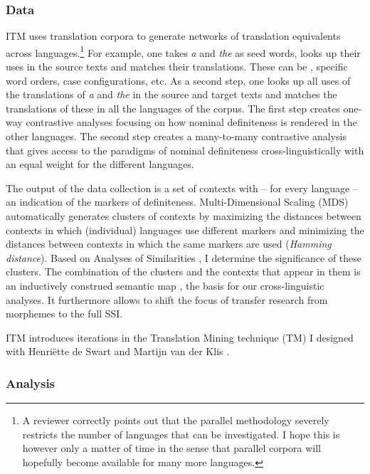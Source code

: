 \documentclass[output=paper,
modfonts
]{langscibook}
\begin{document}
\subsubsection{Data}

ITM uses translation corpora to generate networks of translation equivalents across languages.\footnote{A reviewer correctly points out that the parallel methodology severely restricts the number of languages that can be investigated. I hope this is however only a matter of time in the sense that parallel corpora will hopefully become available for many more languages.} For example, one takes \textit{a} and \textit{the} as seed words, looks up their uses in the  source texts and matches their translations. These can be , specific word orders, case configurations, etc. As a second step, one looks up all uses of the translations of \textit{a} and \textit{the} in the source and target texts and matches the translations of these in all the languages of the corpus. The first step creates one-way contrastive analyses focusing on how  nominal definiteness is rendered in the other languages. The second step creates a many-to-many contrastive analysis that gives access to the paradigms of nominal definiteness cross-linguistically with an equal weight for the different languages.

The output of the data collection is a set of contexts with -- for every language -- an indication of the markers of definiteness. Multi-Dimensional Scaling (MDS) automatically generates clusters of contexts by maximizing the distances between contexts in which (individual) languages use different markers and minimizing the distances between contexts in which the same markers are used (\textit{Hamming distance}). Based on Analyses of Similarities \citep{Clarke1993,Oksanenetal2017}, I determine the significance of these clusters. The combination of the clusters and the contexts that appear in them is an inductively construed semantic map \citep{Haspelmath1997}, the basis for our cross-linguistic analyses. It furthermore allows to shift the focus of transfer research from morphemes to the full SSI.

ITM introduces iterations in the Translation Mining technique (TM) I designed with Henriëtte de Swart and Martijn van der Klis \citep{vanderKlisetal2017}.

\subsubsection{Analysis}
\end{document}
